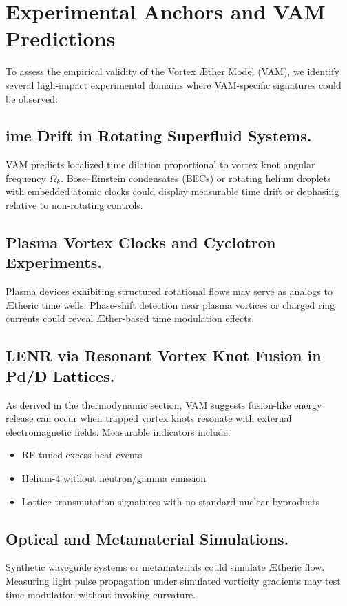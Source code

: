 \section{Experimental Anchors and VAM Predictions}


To assess the empirical validity of the Vortex Æther Model (VAM), we identify several high-impact experimental domains where VAM-specific signatures could be observed:

\subsection{ime Drift in Rotating Superfluid Systems.} VAM predicts localized time dilation proportional to vortex knot angular frequency
$\Omega_k$. Bose–Einstein condensates (BECs) or rotating helium droplets with embedded atomic clocks could display measurable time drift or dephasing relative to non-rotating controls.

\subsection{Plasma Vortex Clocks and Cyclotron Experiments.} Plasma devices exhibiting structured rotational flows may serve as analogs to Ætheric time wells. Phase-shift detection near plasma vortices or charged ring currents could reveal Æther-based time modulation effects.

\subsection{LENR via Resonant Vortex Knot Fusion in Pd/D Lattices.} As derived in the thermodynamic section, VAM suggests fusion-like energy release can occur when trapped vortex knots resonate with external electromagnetic fields. Measurable indicators include:
\begin{itemize}
    \item RF-tuned excess heat events
    \item Helium-4 without neutron/gamma emission
    \item Lattice transmutation signatures with no standard nuclear byproducts
\end{itemize}

\subsection{Optical and Metamaterial Simulations.} Synthetic waveguide systems or metamaterials could simulate Ætheric flow. Measuring light pulse propagation under simulated vorticity gradients may test time modulation without invoking curvature.

